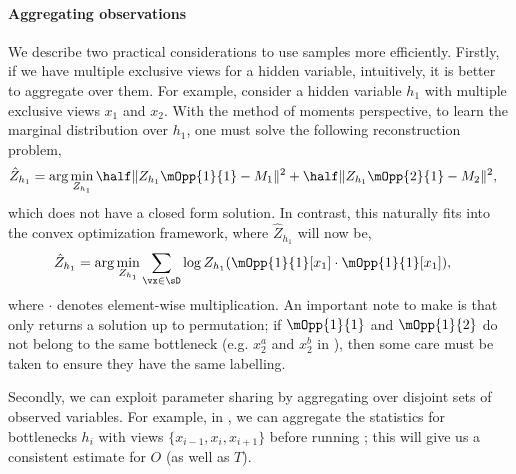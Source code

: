 \paragraph{Aggregating observations}
We describe two practical considerations to use samples more efficiently.
Firstly, if we have multiple exclusive views for a hidden variable,
  intuitively, it is better to aggregate over them. 
For example, consider a hidden variable $h_1$ with multiple exclusive
  views $x_1$ and $x_2$.
With the method of moments perspective, to learn the marginal
  distribution over $h_1$, one must solve the following reconstruction
  problem, 
\begin{align*}
  \hat Z_{h_1} &= \arg\min_{Z_{h_1}} \half \|Z_{h_1} \mOpp{1}{1} - M_1 \|^2 + \half \|Z_{h_1} \mOpp{2}{1} - M_2 \|^2,
\end{align*}
which does not have a closed form solution. 
In contrast, this naturally fits into the convex optimization framework, where $\hat Z_{h_1}$ will now be,
\begin{align*}
  \hat Z_{h_1} &= \arg\min_{Z_{h_1}} \sum_{\vx \in \sD} \log Z_{h_1}( \mOpp{1}{1}[x_1] \cdot \mOpp{1}{1}[x_1] ),
\end{align*}
where $\cdot$ denotes element-wise multiplication.
An important note to make is that \TensorFactorize only returns
  a solution up to permutation; if $\mOpp{1}{1}$ and
  $\mOpp{1}{2}$ do not belong to the same bottleneck (e.g. $x^a_2$ and
  $x^b_2$ in ), then some
  care must be taken to ensure they have the same labelling.

Secondly, we can exploit parameter sharing by aggregating over
  disjoint sets of observed variables. 
For example, in , we can aggregate the statistics for
  bottlenecks $h_i$ with views $\{x_{i-1}, x_{i}, x_{i+1}\}$ before
  running \TensorFactorize; this will give us a consistent estimate for
  $O$ (as well as $T$).

